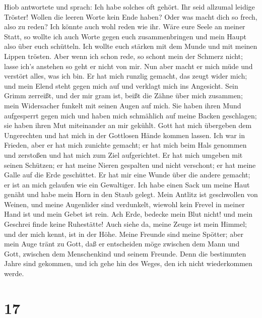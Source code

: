  Hiob antwortete und sprach:  Ich habe solches
oft gehört. Ihr seid allzumal leidige Tröster!  Wollen die
leeren Worte kein Ende haben? Oder was macht dich so frech, also zu
reden?  Ich könnte auch wohl reden wie ihr. Wäre eure Seele
an meiner Statt, so wollte ich auch Worte gegen euch zusammenbringen und
mein Haupt also über euch schütteln.  Ich wollte euch
stärken mit dem Munde und mit meinen Lippen trösten.  Aber
wenn ich schon rede, so schont mein der Schmerz nicht; lasse ich's
anstehen so geht er nicht von mir.  Nun aber macht er mich
müde und verstört alles, was ich bin.  Er hat mich runzlig
gemacht, das zeugt wider mich; und mein Elend steht gegen mich auf und
verklagt mich ins Angesicht.  Sein Grimm zerreißt, und der
mir gram ist, beißt die Zähne über mich zusammen; mein Widersacher
funkelt mit seinen Augen auf mich.  Sie haben ihren Mund
aufgesperrt gegen mich und haben mich schmählich auf meine Backen
geschlagen; sie haben ihren Mut miteinander an mir gekühlt.
 Gott hat mich übergeben dem Ungerechten und hat mich in
der Gottlosen Hände kommen lassen.  Ich war in Frieden,
aber er hat mich zunichte gemacht; er hat mich beim Hals genommen und
zerstoßen und hat mich zum Ziel aufgerichtet.  Er hat mich
umgeben mit seinen Schützen; er hat meine Nieren gespalten und nicht
verschont; er hat meine Galle auf die Erde geschüttet.  Er
hat mir eine Wunde über die andere gemacht; er ist an mich gelaufen wie
ein Gewaltiger.  Ich habe einen Sack um meine Haut genäht
und habe mein Horn in den Staub gelegt.  Mein Antlitz ist
geschwollen von Weinen, und meine Augenlider sind verdunkelt,
 wiewohl kein Frevel in meiner Hand ist und mein Gebet ist
rein.  Ach Erde, bedecke mein Blut nicht! und mein Geschrei
finde keine Ruhestätte!  Auch siehe da, meine Zeuge ist
mein Himmel; und der mich kennt, ist in der Höhe.  Meine
Freunde sind meine Spötter; aber mein Auge tränt zu Gott, 
daß er entscheiden möge zwischen dem Mann und Gott, zwischen dem
Menschenkind und seinem Freunde.  Denn die bestimmten Jahre
sind gekommen, und ich gehe hin des Weges, den ich nicht wiederkommen
werde.

\hypertarget{section-16}{%
\section{17}\label{section-16}}

